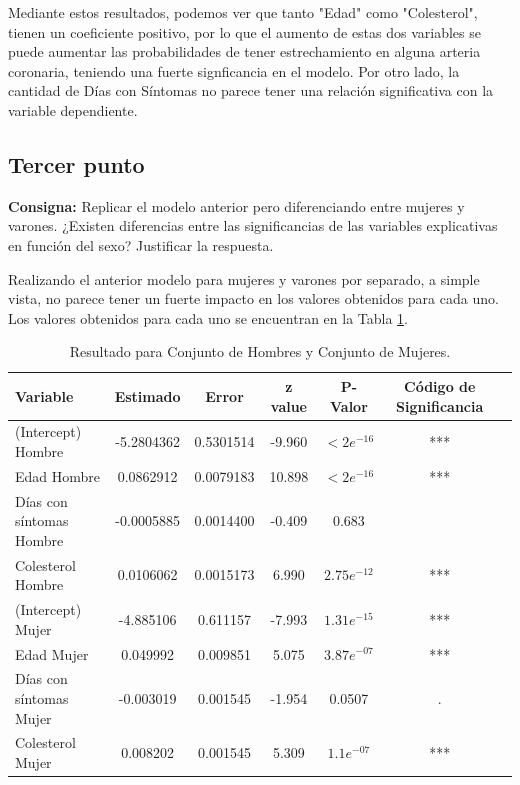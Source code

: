 \documentclass{article} %
\begin{document}
Mediante estos resultados, podemos ver que tanto "Edad" como "Colesterol", tienen un coeficiente positivo, por lo que el aumento de estas dos variables se puede aumentar las probabilidades de tener estrechamiento en alguna arteria coronaria, teniendo una fuerte signficancia en el modelo. Por otro lado, la cantidad de Días con Síntomas no parece tener una relación significativa con la variable dependiente. 


\subsection{Tercer punto}

\textbf{Consigna:} Replicar el modelo anterior pero diferenciando entre mujeres y varones. ¿Existen diferencias entre las significancias de las variables explicativas en función del sexo? Justificar la respuesta.

Realizando el anterior modelo para mujeres y varones por separado, a simple vista, no parece tener un fuerte impacto en los valores obtenidos para cada uno. Los valores obtenidos para cada uno se encuentran en la Tabla \ref{tab:table-punto-2-3}.

\begin{table}[H]
	\centering
		\begin{tabular}{||l || c || c || c || c || c || c ||}
			\hline
			\hline
			Variable & Estimado & Error & z value & P-Valor & Código de Significancia\\
			\hline			
			\hline
			(Intercept) Hombre & -5.2804362 & 0.5301514 & -9.960 & $<2e^{-16}$ & ***\\
			\hline
			Edad Hombre  & 0.0862912 & 0.0079183 & 10.898 & $<2e^{-16}$ & ***\\
			\hline
			Días con síntomas Hombre & -0.0005885 & 0.0014400 & -0.409 & 0.683 & \\
			\hline
			Colesterol Hombre & 0.0106062 & 0.0015173 & 6.990 & $2.75e^{-12}$ & ***\\
			\hline
			(Intercept) Mujer & -4.885106 & 0.611157 & -7.993 & $1.31e^{-15}$ & ***\\
			\hline
			Edad Mujer  & 0.049992 & 0.009851 & 5.075 & $3.87e^{-07}$ & ***\\
			\hline
			Días con síntomas Mujer & -0.003019 & 0.001545 & -1.954 & 0.0507 & . \\
			\hline
			Colesterol Mujer & 0.008202 & 0.001545 & 5.309 & $1.1e^{-07}$ & ***\\
			\hline
			\hline
		\end{tabular}
		\caption{Resultado para Conjunto de Hombres y Conjunto de Mujeres.}
	\label{tab:table-punto-2-3}
\end{table}
\end{document}
